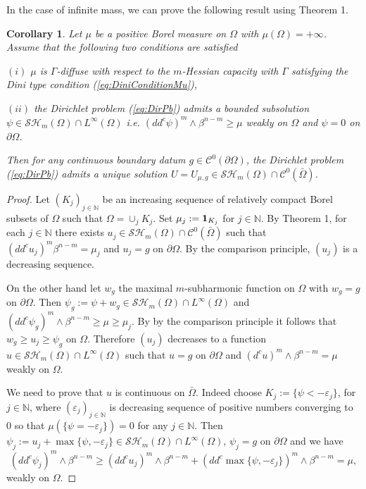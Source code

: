 \documentclass[12pt]{amsart}
\newtheorem{corollary}[theorem]{Corollary}
\theoremstyle{definition}
\numberwithin{theorem}{section}
\numberwithin{equation}{section}
\newcommand{\N}{\mathbb{N}}
\begin{document}
{In the case of infinite mass, we can prove the following result using Theorem 1.
\begin{corollary} \label{cor:continuoussolution} Let  $\mu$ be a positive Borel measure on $\Omega$ with $\mu(\Omega) = + \infty$. Assume that the following two conditions are satisfied

$(i)$  $\mu$  is $\Gamma$-diffuse  with respect to the $m$-Hessian capacity with $\Gamma$  satisfying the  Dini type condition (\ref{eq:DiniConditionMu}), 

$(ii)$  the Dirichlet problem (\ref{eq:DirPb}) admits a bounded subsolution $\psi \in \mathcal{SH}_m(\Omega) \cap L^{\infty} (\Omega)$ i.e.  $(dd^c \psi)^m \wedge \beta^{n-m} \geq \mu$ weakly on $\Omega$ and $\psi = 0$ on $\partial \Omega$.

 Then   for any    continuous boundary datum $g \in \mathcal C^0 (\partial \Omega)$, the Dirichlet problem (\ref{eq:DirPb}) admits a unique solution  $U = U_{\mu,g} \in \mathcal{SH}_m (\Omega) \cap \mathcal C^0  (\bar{\Omega})$.
\end{corollary}
\begin{proof} Let $(K_j)_{j \in \N}$ be  an increasing sequence of relatively compact Borel subsets of  $\Omega$ such that $\Omega = \cup_j K_j$.
Set $\mu_j := {\bf 1}_{K_j}$ for $j \in \N$.  By Theorem  1,  for each $j \in \N$ there exists  $u_j \in \mathcal{SH}_m(\Omega) \cap \mathcal{C}^0 (\bar{\Omega})$ such that $(dd^c u_j)^m \beta^{n-m} = \mu_j$ and $u_j = g$ on $\partial \Omega$. By the comparison principle, $(u_j)$ is a decreasing sequence.

On the other hand let $w_g$ the maximal $m$-subharmonic function on $\Omega$ with $w_g = g$ on $\partial \Omega$. Then $\psi_g := \psi + w_g \in \mathcal{SH}_m(\Omega) \cap L^{\infty} ({\Omega})$ and $(dd^c \psi_g)^m \wedge \beta^{n-m} \geq \mu \geq \mu_j$. By by the comparison principle it follows that $w_g \geq u_j \geq \psi_g$ on  $\Omega$.
Therefore $(u_j)$ decreases to a function $u \in \mathcal{SH}_m(\Omega) \cap L^{\infty} ({\Omega})$ such that $u=g$ on $\partial \Omega$  and $(d^c u)^m \wedge \beta^{n-m} = \mu$ weakly on $\Omega$. 

We need to prove that $u$ is  continuous on $\bar{\Omega}$. Indeed  choose $K_j := \{ \psi < -\varepsilon_ j\}$, for $j \in \N$,  where $(\varepsilon_j)_{j \in \N}$ is decreasing sequence of positive numbers converging to $0$ so that $\mu (\{ \psi = -\varepsilon_ j\}) = 0$  for any $j \in \N$. Then $ \psi_j := u_j + \max \{\psi,-\varepsilon_ j\}  \in \mathcal{SH}_m(\Omega) \cap L^{\infty} ({\Omega})$, $\psi_j = g$ on $\partial \Omega$ and we have
$$
(dd^c \psi_j)^m \wedge \beta^{n-m} \geq (dd^c u_j)^m \wedge \beta^{n-m} + (dd^c  \max \{\psi,-\varepsilon_ j\})^m \wedge \beta^{n-m} = \mu,
$$
 weakly on $\Omega$.
 

\end{proof}}
\end{document}
